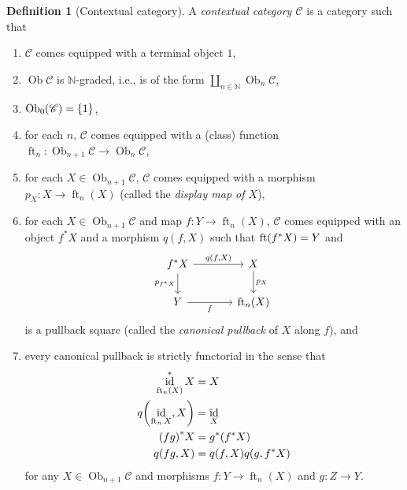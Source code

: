 \documentclass[10pt,letterpaper,cm]{nupset}
\theoremstyle{definition}
\newtheorem{definition}{Definition}[subsection]
\theoremstyle{theorem}
\theoremstyle{remark}
\DeclareMathOperator{\ft}{ft}
\DeclareMathOperator{\ob}{Ob}
\newcommand{\0}{\mathbf{0}}
\newcommand{\1}{\mathbf{1}}
\newcommand{\2}{\mathbf{2}}
\renewcommand{\c}{\mathscr{C}}
\newcommand{\N}{\mathbb N}
\DeclareMathOperator{\idd}{id}
\newcommand{\be}{\begin{enumerate}}
\newcommand{\ee}{\end{enumerate}}
\begin{document}
\begin{definition}[Contextual category]\label{ccat} A \textit{contextual category $\c$} is a category  such that
\be[label=(\roman*)]
\item $\c$ comes equipped with a terminal object $1$,
\item $\ob{\c}$ is $\N$-graded, i.e., is of the form $\coprod_{n\in \N}\ob_n{\c}$,
\item $\ob_0(\c) = \mleft\{1\mright\}$,
\item for each $n$, $\c$ comes equipped with a (class) function $\ft_n: \ob_{n+1}{\c} \to \ob_n{\c}$,
\item for each $X\in \ob_{n+1}{\c}$, $\c$ comes equipped with a morphism $p_X : X \to \ft_n(X)$ (called the \textit{display map of $X$}),
\item for each $X\in \ob_{n+1}{\c}$ and map $f: Y \to \ft_n(X)$, $\c$ comes equipped with an object $f^{\ast}{X}$ and a morphism $q(f,X)$ such that $\ft\mleft(f^{*} X\mright)=Y$ and 
\[
\begin{tikzcd}[column sep=large]
f^{\ast}{X} \arrow[d, "p_{f^{\ast}{X}}"'] \arrow[r, "{q(f,X)}"] & X \arrow[d, "p_X"] \\
Y \arrow[r, "f"']                                               & \ft_n(X)          
\end{tikzcd}
\] is a pullback square (called the \textit{canonical pullback} of $X$ along $f$), and
\item every canonical pullback is strictly functorial in the sense that
\begin{align*}
\idd_{\ft_n(X)}^{\ast}{X}& = X
\\ q\mleft(\idd_{\ft_n{X}}, X\mright) & = \idd_X
\\ \mleft(fg\mright)^{\ast}{X} & = g^{\ast}\mleft(f^{\ast}{X}\mright) 
\\ q\mleft(fg, X\mright) & = q\mleft(f, X\mright)q\mleft(g, f^{\ast}{X}\mright)
\end{align*}
for any $X\in \ob_{n+1}{\c}$ and morphisms $f: Y \to \ft_n(X)$ and $g:Z \to Y$.
\ee
\end{definition}
\end{document}
